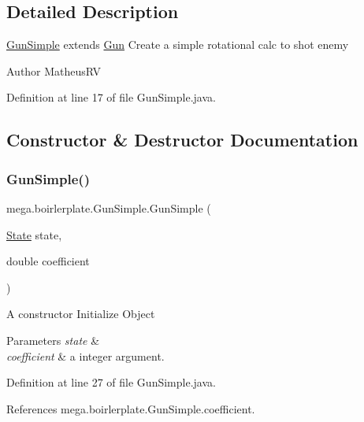 \subsection{Detailed Description}
\hyperlink{classmega_1_1boirlerplate_1_1_gun_simple}{Gun\+Simple} extends \hyperlink{classmega_1_1boirlerplate_1_1_gun}{Gun} Create a simple rotational calc to shot enemy

\begin{DoxyAuthor}{Author}
Matheus\+RV 
\end{DoxyAuthor}


Definition at line 17 of file Gun\+Simple.\+java.



\subsection{Constructor \& Destructor Documentation}
\mbox{\label{classmega_1_1boirlerplate_1_1_gun_simple_ae3e0f2a1f6a8bda8d4129d189f380a49}} 
\subsubsection{\texorpdfstring{Gun\+Simple()}{GunSimple()}}
{\footnotesize\ttfamily mega.\+boirlerplate.\+Gun\+Simple.\+Gun\+Simple (\begin{DoxyParamCaption}\item[{\hyperlink{classmega_1_1boirlerplate_1_1_state}{State}}]{state,  }\item[{double}]{coefficient }\end{DoxyParamCaption})}

A constructor Initialize Object 
\begin{DoxyParams}{Parameters}
{\em state} & \\
\hline
{\em coefficient} & a integer argument. \\
\hline
\end{DoxyParams}


Definition at line 27 of file Gun\+Simple.\+java.



References mega.\+boirlerplate.\+Gun\+Simple.\+coefficient.



